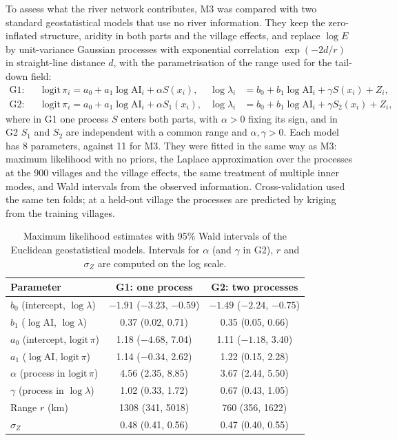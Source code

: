 \documentclass[11pt,a4paper]{article}
\newcommand{\AI}{\mathrm{AI}}
\begin{document}
To assess what the river network contributes, M3 was compared with two standard geostatistical models that use no river information. They keep the zero-inflated structure, aridity in both parts and the village effects, and replace $\log E$ by unit-variance Gaussian processes with exponential correlation $\exp(-2d/r)$ in straight-line distance $d$, with the parametrisation of the range used for the tail-down field:
\begin{align*}
\text{G1:}\quad & \mathrm{logit}\,\pi_i = a_0 + a_1 \log\AI_i + \alpha S(x_i), & \log\lambda_i &= b_0 + b_1 \log\AI_i + \gamma S(x_i) + Z_i,\\
\text{G2:}\quad & \mathrm{logit}\,\pi_i = a_0 + a_1 \log\AI_i + \alpha S_1(x_i), & \log\lambda_i &= b_0 + b_1 \log\AI_i + \gamma S_2(x_i) + Z_i,
\end{align*}
where in G1 one process $S$ enters both parts, with $\alpha > 0$ fixing its sign, and in G2 $S_1$ and $S_2$ are independent with a common range and $\alpha, \gamma > 0$. Each model has 8 parameters, against 11 for M3. They were fitted in the same way as M3: maximum likelihood with no priors, the Laplace approximation over the processes at the 900 villages and the village effects, the same treatment of multiple inner modes, and Wald intervals from the observed information. Cross-validation used the same ten folds; at a held-out village the processes are predicted by kriging from the training villages.

\begin{table}[H]
\centering
\small
\caption{Maximum likelihood estimates with 95\% Wald intervals of the Euclidean geostatistical models. Intervals for $\alpha$ (and $\gamma$ in G2), $r$ and $\sigma_Z$ are computed on the log scale.}
\label{tab:gpest}
\begin{tabular}{lcc}
\toprule
Parameter & G1: one process & G2: two processes \\
\midrule
$b_0$ (intercept, $\log\lambda$) & $-1.91$ ($-3.23$, $-0.59$) & $-1.49$ ($-2.24$, $-0.75$) \\
$b_1$ ($\log\AI$, $\log\lambda$) & 0.37 (0.02, 0.71) & 0.35 (0.05, 0.66) \\
$a_0$ (intercept, $\mathrm{logit}\,\pi$) & 1.18 ($-4.68$, 7.04) & 1.11 ($-1.18$, 3.40) \\
$a_1$ ($\log\AI$, $\mathrm{logit}\,\pi$) & 1.14 ($-0.34$, 2.62) & 1.22 (0.15, 2.28) \\
$\alpha$ (process in $\mathrm{logit}\,\pi$) & 4.56 (2.35, 8.85) & 3.67 (2.44, 5.50) \\
$\gamma$ (process in $\log\lambda$) & 1.02 (0.33, 1.72) & 0.67 (0.43, 1.05) \\
Range $r$ (km) & 1308 (341, 5018) & 760 (356, 1622) \\
$\sigma_Z$ & 0.48 (0.41, 0.56) & 0.47 (0.40, 0.55) \\
\bottomrule
\end{tabular}
\end{table}
\end{document}
